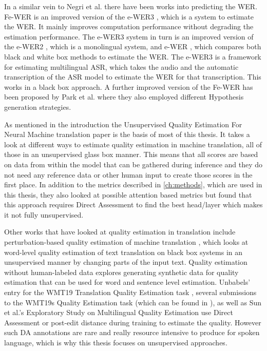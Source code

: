 In a similar vein to Negri et al.\cite{negri-etal-2014-quality} there have been works into predicting the WER. Fe-WER \cite{park2023fastworderrorrate} is an improved version of the e-WER3 \cite{e-wer3}, which is a system to estimate the WER. It mainly improves computation performance without degrading the estimation performance. 
The e-WER3 system in turn is an improved version of the e-WER2 \cite{ali2020worderrorrateestimation}, which is a monolingual system, and e-WER \cite{Ali2018WordER}, which compares both black and white box methods to estimate the WER. The e-WER3 is a framework for estimating multilingual ASR, which takes the audio and the automatic transcription of the ASR model to estimate the WER for that transcription. This works in a black box approach. A further improved version of the Fe-WER has been proposed by Park et al. \cite{park2024automaticspeechrecognitionsystemindependent} where they also employed different Hypothesis generation strategies. 

As mentioned in the introduction the Unsupervised Quality Estimation For Neural Machine translation paper \cite{fomicheva2020unsupervised} is the basis of most of this thesis. It takes a look at different ways to estimate quality estimation in machine translation, all of those in an unsupervised glass box manner. This means that all scores are based on data from within the model that can be gathered during inference and they do not need any reference data or other human input to create those scores in the first place. In addition to the metrics described in \autoref{ch:methods}, which are used in this thesis, they also looked at possible attention based metrics but found that this approach requires Direct Assessment to find the best head/layer which makes it not fully unsupervised. 

Other works that have looked at quality estimation in translation include perturbation-based quality estimation of machine translation \cite{dinh2023perturbationbasedqeexplainableunsupervised}, which looks at word-level quality estimation of text translation on black box systems in an unsupervised manner by changing parts of the input text.  
Quality estimation without human-labeled data \cite{tuan-etal-2021-quality} explores generating synthetic data for quality estimation that can be used for word and sentence level estimation. 
Unbabels' entry for the WMT19 Translation Quality Estimation task \cite{kepler-etal-2019-unbabels}, several submissions to the WMT19s Quality Estimation task (which can be found in \cite{fonseca-etal-2019-findings}), as well as Sun et al.'s Exploratory Study on Multilingual Quality Estimation \cite{sun-etal-2020-exploratory} use Direct Assessment or post-edit distance during training to estimate the quality. 
However such DA annotations are rare and really resource intensive to produce for spoken language, which is why this thesis focuses on unsupervised approaches. 